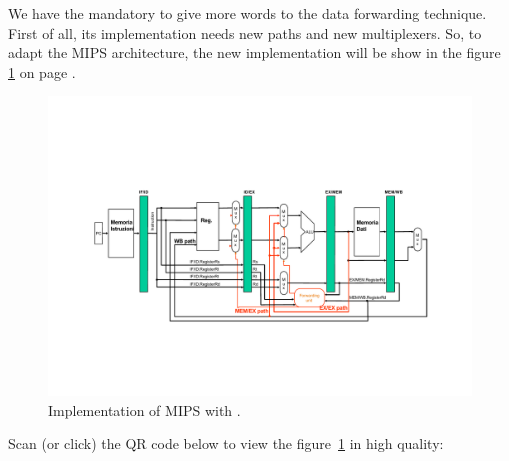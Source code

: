 We have the mandatory to give more words to the data forwarding technique. First of all, its implementation needs new paths and new multiplexers. So, to adapt the MIPS architecture, the new implementation will be show in the figure \ref{fig: implementation of MIPS with Forwarding Unit} on page \pageref{fig: implementation of MIPS with Forwarding Unit}.

\newpage

\begin{figure}[!htp]
    \centering
    \includegraphics[width=\textwidth]{img/implementation-mips-forwarding-unit-1.pdf}
    \caption{Implementation of MIPS with .\cite{pipelining-slides}}
    \label{fig: implementation of MIPS with Forwarding Unit}
\end{figure}

\noindent
Scan (or click) the QR code below to view the figure~\ref{fig: implementation of MIPS with Forwarding Unit} in high quality:
\begin{center}
\end{center}

